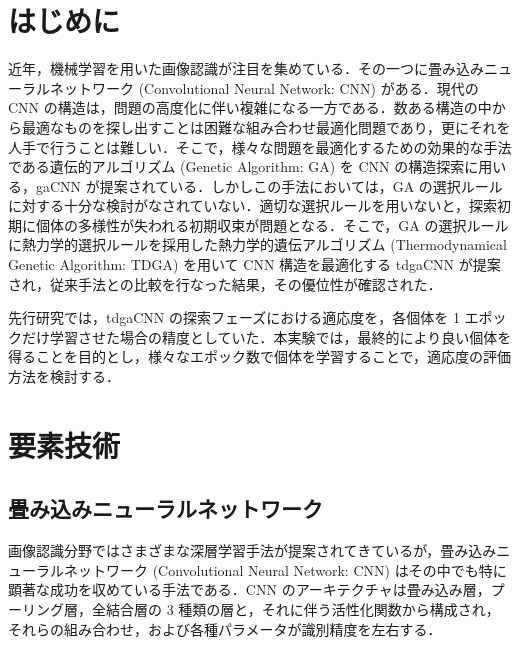 \documentclass[twocolumn]{jarticle}     %
\begin{document}

\section{はじめに}
近年，機械学習を用いた画像認識が注目を集めている．その一つに畳み込みニューラルネットワーク (Convolutional Neural Network: CNN) がある．現代の CNN の構造は，問題の高度化に伴い複雑になる一方である．数ある構造の中から最適なものを探し出すことは困難な組み合わせ最適化問題であり，更にそれを人手で行うことは難しい．そこで，様々な問題を最適化するための効果的な手法である遺伝的アルゴリズム (Genetic Algorithm: GA) を CNN の構造探索に用いる，gaCNN \cite{9504850} が提案されている．しかしこの手法においては，GA の選択ルールに対する十分な検討がなされていない．適切な選択ルールを用いないと，探索初期に個体の多様性が失われる初期収束が問題となる．そこで，GA の選択ルールに熱力学的選択ルールを採用した熱力学的遺伝アルゴリズム (Thermodynamical Genetic Algorithm: TDGA) を用いて CNN 構造を最適化する tdgaCNN が提案され，従来手法との比較を行なった結果，その優位性が確認された．\par
先行研究では，tdgaCNN の探索フェーズにおける適応度を，各個体を 1 エポックだけ学習させた場合の精度としていた．本実験では，最終的により良い個体を得ることを目的とし，様々なエポック数で個体を学習することで，適応度の評価方法を検討する．

\section{要素技術}

\subsection{畳み込みニューラルネットワーク}
画像認識分野ではさまざまな深層学習手法が提案されてきているが，畳み込みニューラルネットワーク (Convolutional Neural Network: CNN) はその中でも特に顕著な成功を収めている手法である．CNN のアーキテクチャは畳み込み層，プーリング層，全結合層の 3 種類の層と，それに伴う活性化関数から構成され，それらの組み合わせ，および各種パラメータが識別精度を左右する．
\end{document}
